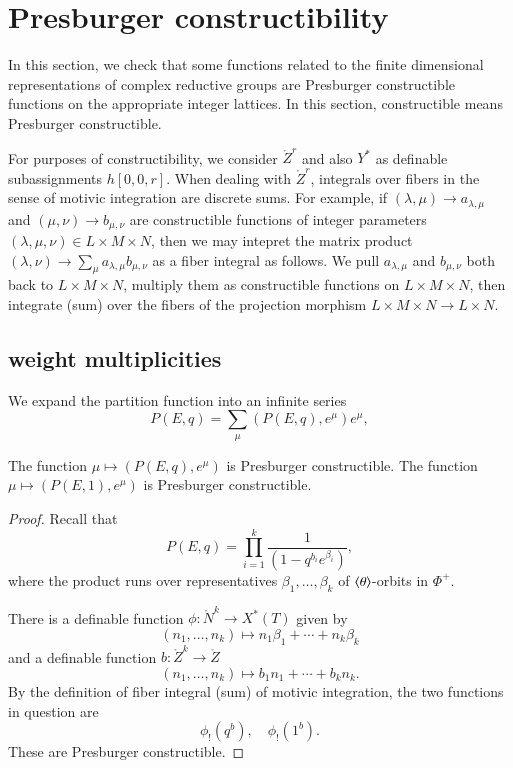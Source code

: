 \section{Presburger constructibility}

In this section,
we check that some functions related to the finite dimensional representations of complex reductive groups
are Presburger constructible functions on the appropriate integer lattices.  In this section, constructible means Presburger
constructible.

\begin{remark}\label{rem:matrix}
For purposes of constructibility, we consider $\ring{Z}^r$ and also $Y^*$ as 
definable subassignments $h[0,0,r]$. When dealing with $\ring{Z}^r$, integrals over fibers
in the sense of motivic integration are discrete sums.  For example, if $(\lambda,\mu)\to a_{\lambda,\mu}$
and $(\mu,\nu)\to b_{\mu,\nu}$ are constructible functions of integer parameters $(\lambda,\mu,\nu)\in L\times M\times N$,
then we may intepret the matrix product $(\lambda,\nu)\to \sum_{\mu} a_{\lambda,\mu} b_{\mu,\nu}$ as a
fiber integral as follows.  We pull $a_{\lambda,\mu}$ and $b_{\mu,\nu}$ both back to $L\times M\times N$, multiply
them as constructible functions on $L\times M\times N$, then integrate (sum) over the fibers of the projection morphism
$L\times M\times N\to L\times N$.
\end{remark}




\subsection{weight multiplicities}

We expand the partition function into an infinite series
\[
P(E,q) = \sum_\mu (P(E,q),e^\mu) e^{\mu},
\]

\begin{lemma}\label{lemma:partition}
The function $\mu\mapsto (P(E,q),e^\mu)$ is Presburger constructible.
The function $\mu\mapsto (P(E,1),e^\mu)$ is Presburger constructible.
\end{lemma}

\begin{proof} 
Recall that
\[
P(E,q) = \prod_{i=1}^k \frac{1}{ (1-q^{b_i} e^{\beta_i})},
\]
where the product runs over representatives $\beta_1,\ldots,\beta_k$ of $\langle{\theta}\rangle$-orbits in $\Phi^+$.

There is a definable function $\phi:\ring{N}^k\to X^*(T)$ given by
\[
(n_1,\ldots,n_k)\mapsto n_1 \beta_1+\cdots + n_k \beta_k
\]
and a definable function $b:\ring{Z}^k\to \ring{Z}$ 
\[
(n_1,\ldots,n_k)\mapsto b_1 n_1+\cdots + b_k n_k.
\]
By the definition of fiber integral (sum) of motivic integration,  the two  functions in question are
\[
\phi_! (q^b),\quad \phi_!(1^b).
\]
These are Presburger constructible.
\end{proof}

